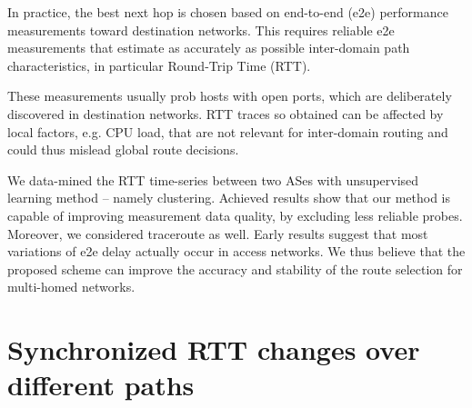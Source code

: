 In practice, the best next hop is chosen based on end-to-end (e2e) performance measurements toward destination networks. 
This requires reliable e2e measurements that estimate as accurately as possible inter-domain path characteristics, in particular Round-Trip Time (RTT).

These measurements usually prob
hosts with open ports, which are deliberately discovered in destination networks.
RTT traces so obtained can be affected by local factors, e.g. CPU load, that are not relevant for inter-domain routing and could thus mislead global route decisions. 

We data-mined the RTT time-series between two ASes with unsupervised learning method -- namely clustering.
Achieved results show that our method is capable of improving measurement data quality, by excluding less reliable probes.
Moreover, we considered traceroute as well. 
Early results suggest that most variations of e2e delay actually occur in access networks. We thus believe that the proposed scheme can improve the accuracy and stability of the route selection for multi-homed networks.

\section{Synchronized RTT changes over different paths}
\label{sec:ripe_case_study}